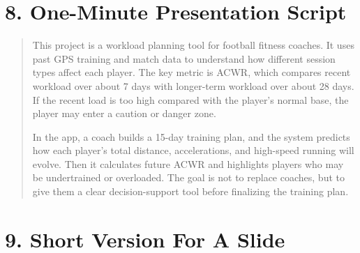 \documentclass[11pt,a4paper]{article}
\begin{document}
\section*{8. One-Minute Presentation Script}

\begin{quote}
This project is a workload planning tool for football fitness coaches. It uses past GPS training and match data to understand how different session types affect each player. The key metric is ACWR, which compares recent workload over about 7 days with longer-term workload over about 28 days. If the recent load is too high compared with the player's normal base, the player may enter a caution or danger zone.

In the app, a coach builds a 15-day training plan, and the system predicts how each player's total distance, accelerations, and high-speed running will evolve. Then it calculates future ACWR and highlights players who may be undertrained or overloaded. The goal is not to replace coaches, but to give them a clear decision-support tool before finalizing the training plan.
\end{quote}

\section*{9. Short Version For A Slide}

\begin{center}
\end{center}
\end{document}
